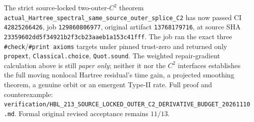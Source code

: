 \documentclass[11pt]{amsart}
\begin{document}
The strict source-locked two-outer-\(C^2\) theorem
\texttt{actual\_Hartree\_spectral\_same\_source\_outer\_splice\_C2}
has now passed CI \texttt{42825266426}, job
\texttt{129860806977}, original artifact
\texttt{13768179716}, at source SHA \texttt{23359602dd5f34921b2f3cb23aaeb1a153c41fff}.
The job ran the exact three \texttt{\#check}/\texttt{\#print axioms}
targets under pinned trust-zero and returned only
\texttt{propext}, \texttt{Classical.choice}, \texttt{Quot.sound}.
The weighted repair-gradient calculation above is still
\emph{paper only}; neither it nor the \(C^2\) interfaces
establishes the full moving nonlocal Hartree residual's time
gain, a projected smoothing theorem, a genuine orbit or an
emergent Type-II rate. Full proof and counterexample:
\texttt{verification/HBL\_213\_SOURCE\_LOCKED\_OUTER\_C2\_DERIVATIVE\_BUDGET\_20261110.md}.
Formal original revised acceptance remains \(11/13\).
\end{document}
